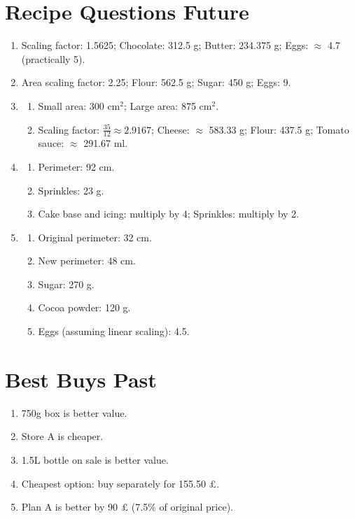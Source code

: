 \documentclass[12pt]{article}
\begin{document}
\section*{Recipe Questions Future}
\begin{enumerate}[resume]
    \item Scaling factor: 1.5625; Chocolate: 312.5 g; Butter: 234.375 g; Eggs: $\approx$ 4.7 (practically 5).
    \item Area scaling factor: 2.25; Flour: 562.5 g; Sugar: 450 g; Eggs: 9.
    \item 
    \begin{enumerate}
        \item Small area: 300 cm$^2$; Large area: 875 cm$^2$.
        \item Scaling factor: $\frac{35}{12} \approx 2.9167$; Cheese: $\approx$ 583.33 g; Flour: 437.5 g; Tomato sauce: $\approx$ 291.67 ml.
    \end{enumerate}
    \item 
    \begin{enumerate}
        \item Perimeter: 92 cm.
        \item Sprinkles: 23 g.
        \item Cake base and icing: multiply by 4; Sprinkles: multiply by 2.
    \end{enumerate}
    \item 
    \begin{enumerate}
        \item Original perimeter: 32 cm.
        \item New perimeter: 48 cm.
        \item Sugar: 270 g.
        \item Cocoa powder: 120 g.
        \item Eggs (assuming linear scaling): 4.5.
    \end{enumerate}
\end{enumerate}

\section*{Best Buys Past}
\begin{enumerate}[resume]
    \item 750g box is better value.
    \item Store A is cheaper.
    \item 1.5L bottle on sale is better value.
    \item Cheapest option: buy separately for 155.50 £.
    \item Plan A is better by 90 £ (7.5\% of original price).
\end{enumerate}
\end{document}
